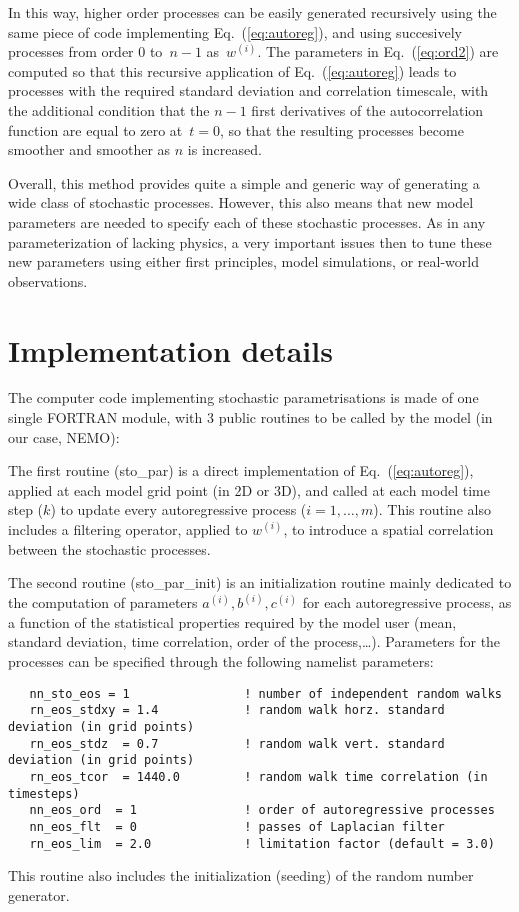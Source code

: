 \documentclass[NEMO_book]{subfiles}
\begin{document}
\noindent
In this way, higher order processes can be easily generated recursively using the same piece of code implementing Eq.~(\ref{eq:autoreg}), and using succesively processes from order $0$ to~$n-1$ as~$w^{(i)}$.
The parameters in Eq.~(\ref{eq:ord2}) are computed so that this recursive application
of Eq.~(\ref{eq:autoreg}) leads to processes with the required standard deviation
and correlation timescale, with the additional condition that
the $n-1$ first derivatives of the autocorrelation function
are equal to zero at~$t=0$, so that the resulting processes
become smoother and smoother as $n$ is increased.

Overall, this method provides quite a simple and generic way of generating a wide class of stochastic processes. However, this also means that new model parameters are needed to specify each of these stochastic processes. As in any parameterization of lacking physics, a very important issues then to tune these new parameters using either first principles, model simulations, or real-world observations.

\section{Implementation details}
\label{STO_thech_details}
The computer code implementing stochastic parametrisations is made of one single FORTRAN module,
with 3 public routines to be called by the model (in our case, NEMO):

The first routine ({sto\_par}) is a direct implementation of Eq.~(\ref{eq:autoreg}),
applied at each model grid point (in 2D or 3D),
and called at each model time step ($k$) to update
every autoregressive process ($i=1,\ldots,m$).
This routine also includes a filtering operator, applied to $w^{(i)}$,
to introduce a spatial correlation between the stochastic processes.

The second routine ({sto\_par\_init})
is an initialization routine mainly dedicated
to the computation of parameters $a^{(i)}, b^{(i)}, c^{(i)}$
for each autoregressive process, as a function of the statistical properties
required by the model user (mean, standard deviation, time correlation,
order of the process,\ldots). Parameters for the processes can be specified through the following namelist parameters:
\begin{alltt}
\tiny
\begin{verbatim}
   nn_sto_eos = 1                ! number of independent random walks 
   rn_eos_stdxy = 1.4            ! random walk horz. standard deviation (in grid points)
   rn_eos_stdz  = 0.7            ! random walk vert. standard deviation (in grid points)
   rn_eos_tcor  = 1440.0         ! random walk time correlation (in timesteps)
   nn_eos_ord  = 1               ! order of autoregressive processes
   nn_eos_flt  = 0               ! passes of Laplacian filter
   rn_eos_lim  = 2.0             ! limitation factor (default = 3.0)
\end{verbatim}
\end{alltt}
This routine also includes the initialization (seeding)
of the random number generator.
\end{document}
